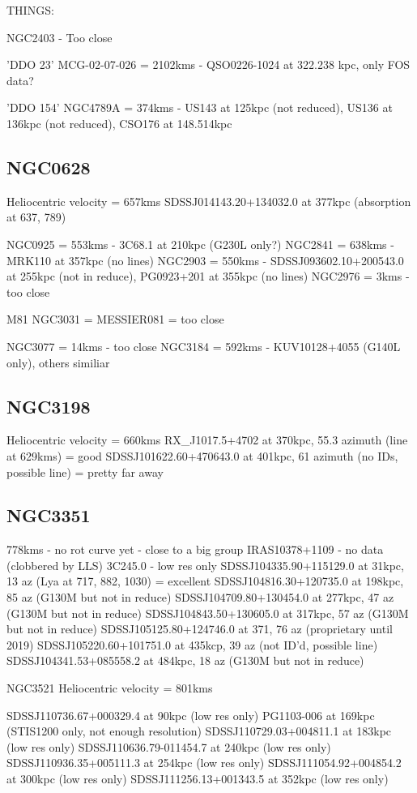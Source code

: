 \documentclass[iop]{emulateapj-rtx4}
\begin{document}
THINGS:

NGC2403 - Too close
    
'DDO 23'
MCG-02-07-026 = 2102kms - QSO0226-1024 at 322.238 kpc, only FOS data?

'DDO 154'
NGC4789A = 374kms - US143 at 125kpc (not reduced), US136 at 136kpc (not reduced), CSO176 at 148.514kpc

\subsection{NGC0628}
Heliocentric velocity = 657kms
SDSSJ014143.20+134032.0 at 377kpc (absorption at 637, 789)


NGC0925 = 553kms - 3C68.1 at 210kpc (G230L only?)
NGC2841 = 638kms - MRK110 at 357kpc (no lines)
NGC2903 = 550kms - SDSSJ093602.10+200543.0 at 255kpc (not in reduce), PG0923+201 at 355kpc (no lines)
NGC2976 = 3kms - too close

M81
NGC3031 = MESSIER081 = too close

NGC3077 = 14kms - too close
NGC3184 = 592kms - KUV10128+4055 (G140L only), others similiar

\subsection{NGC3198}
Heliocentric velocity = 660kms
RX_J1017.5+4702 at 370kpc, 55.3 azimuth (line at 629kms) = good
SDSSJ101622.60+470643.0 at 401kpc, 61 azimuth (no IDs, possible line) = pretty far away


\subsection{NGC3351}
778kms - no rot curve yet - close to a big group
IRAS10378+1109 - no data (clobbered by LLS)
3C245.0 - low res only
SDSSJ104335.90+115129.0 at 31kpc, 13 az (Lya at 717, 882, 1030) = excellent
SDSSJ104816.30+120735.0 at 198kpc, 85 az (G130M but not in reduce)
SDSSJ104709.80+130454.0 at 277kpc, 47 az (G130M but not in reduce)
SDSSJ104843.50+130605.0 at 317kpc, 57 az (G130M but not in reduce)
SDSSJ105125.80+124746.0 at 371, 76 az (proprietary until 2019)
SDSSJ105220.60+101751.0 at 435kcp, 39 az (not ID'd, possible line)
SDSSJ104341.53+085558.2 at 484kpc, 18 az (G130M but not in reduce)


NGC3521
Heliocentric velocity = 801kms

SDSSJ110736.67+000329.4 at 90kpc (low res only)
PG1103-006 at 169kpc (STIS1200 only, not enough resolution)
SDSSJ110729.03+004811.1 at 183kpc (low res only)
SDSSJ110636.79-011454.7 at 240kpc (low res only)
SDSSJ110936.35+005111.3 at 254kpc (low res only)
SDSSJ111054.92+004854.2 at 300kpc (low res only)
SDSSJ111256.13+001343.5 at 352kpc (low res only)
\end{document}
